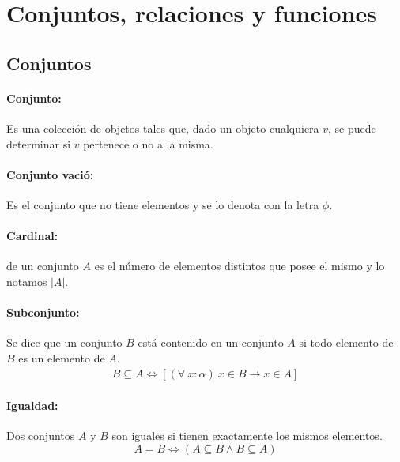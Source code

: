 \section{Conjuntos, relaciones y funciones}
\subsection{Conjuntos}
\paragraph{Conjunto:} Es una colección de objetos tales que, dado un objeto cualquiera $v$, se puede determinar si $v$ pertenece o no a la misma.

\paragraph{Conjunto vació:} 
Es el conjunto que no tiene elementos  y se lo denota con la letra $\phi$.

\paragraph{Cardinal:} 
de un conjunto $A$ es el número de elementos distintos que posee el mismo y lo notamos $|A|$.
    
\paragraph{Subconjunto:} 
Se dice que un conjunto $B$ está contenido en un conjunto $A$ si todo elemento de $B$ es un elemento de $A$.
    \begin{align*}
        B\subseteq A\iff[(\forall~x:\alpha)~x\in B \to x\in A]
    \end{align*}
    
\paragraph{Igualdad: }
Dos conjuntos $A$ y $B$ son iguales si tienen exactamente los mismos elementos.
    \begin{equation*}
        A = B \iff (A\subseteq B \land B\subseteq A)
    \end{equation*}
    
